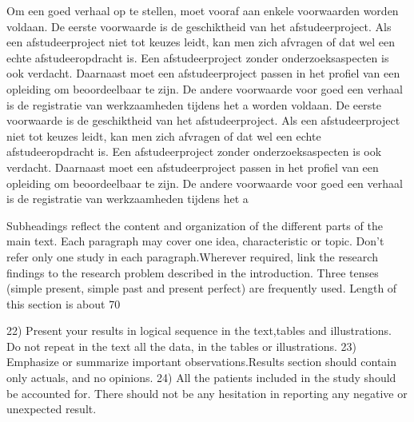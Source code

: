 		Om een goed verhaal op te stellen, moet vooraf aan enkele voorwaarden
		worden voldaan. De eerste voorwaarde is de geschiktheid van het
		afstudeerproject. Als een afstudeerproject niet tot keuzes leidt, kan
		men zich afvragen of dat wel een echte afstudeeropdracht is. Een
		afstudeerproject zonder onderzoeksaspecten is ook verdacht. Daarnaast
		moet een afstudeerproject passen in het profiel van een opleiding om
		beoordeelbaar te zijn. De andere voorwaarde voor goed een verhaal is
		de registratie van werkzaamheden tijdens het a
		worden voldaan. De eerste voorwaarde is de geschiktheid van het
		afstudeerproject. Als een afstudeerproject niet tot keuzes leidt, kan
		men zich afvragen of dat wel een echte afstudeeropdracht is. Een
		afstudeerproject zonder onderzoeksaspecten is ook verdacht. Daarnaast
		moet een afstudeerproject passen in het profiel van een opleiding om
		beoordeelbaar te zijn. De andere voorwaarde voor goed een verhaal is
		de registratie van werkzaamheden tijdens het a
		
		
		Subheadings reflect the content and organization of the different parts of the main text. Each paragraph may cover one idea, characteristic or topic. Don’t refer only one study in each paragraph.Wherever required, link the research findings to the research problem described in the introduction. Three tenses (simple present, simple past and present perfect) are frequently used. Length of this section is about 70%
		
		
		22)   Present your results in logical sequence  in the text,tables and illustrations.  Do not repeat in the text all the data, in the tables or illustrations.
		23)   Emphasize or summarize important observations.Results  section should contain only  actuals, and no opinions.
		24)   All  the  patients  included  in  the  study  should  be accounted for. There should not be any hesitation in reporting any negative or unexpected result.
		
		
		
		\begin{figure}[!ht]
			\centering
			\begin{floatrow}
				
			\end{floatrow}
		\end{figure}
		
